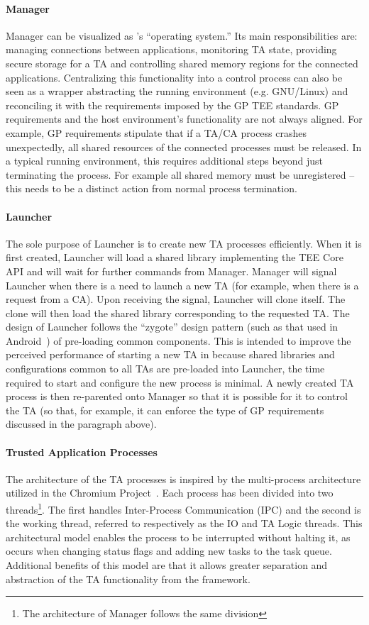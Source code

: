 \documentclass[10pt,conference,letterpaper]{IEEEtran}
\newcommand{\opentee}{\protect{TEE-Vi}\xspace}
\newcommand{\opentee}{\protect{Open-TEE}\xspace}
\begin{document}
\paragraph{Manager}
Manager can be visualized as \opentee's ``operating system.'' Its main responsibilities are: managing connections between applications, monitoring TA state, providing secure storage for a TA and controlling shared memory regions for the connected applications. Centralizing this functionality into a control process can also be seen as a wrapper abstracting the running environment (e.g. GNU/Linux) and reconciling it with the requirements imposed by the GP TEE standards. GP requirements and the host environment's functionality are not always aligned. For example, GP requirements stipulate that if a TA/CA process crashes unexpectedly, all shared resources of the connected processes must be released. In a typical running environment, this requires additional steps beyond just terminating the process. For example all shared memory must be unregistered -- this needs to be a distinct action from normal process termination.

\paragraph{Launcher}
The sole purpose of Launcher is to create new TA processes efficiently. When it is first created, Launcher will load a shared library implementing the TEE Core API and will wait for further commands from Manager. Manager will signal Launcher when there is a need to launch a new TA (for example, when there is a request from a CA). Upon receiving the signal, Launcher will clone itself. The clone will then load the shared library corresponding to the requested TA. The design of Launcher follows the ``zygote'' design pattern (such as that used in Android~\cite{web:zygote}) of pre-loading common components. This is intended to improve the perceived performance of starting a new TA in \opentee because shared libraries and configurations common to all TAs are pre-loaded into Launcher, the time required to start and configure the new process is minimal. A newly created TA process is then re-parented onto Manager so that it is possible for it to control the TA (so that, for example, it can enforce the type of GP requirements discussed in the paragraph above).


\paragraph{Trusted Application Processes}
The architecture of the TA processes is inspired by the multi-process architecture utilized in the Chromium Project~\cite{web:Chromium-multi-arch}. Each process has been divided into two threads\footnote{The architecture of Manager follows the same division}. The first handles Inter-Process Communication (IPC) and the second is the working thread, referred to respectively as the IO and TA Logic threads. This architectural model enables the process to be interrupted without halting it, as occurs when changing status flags and adding new tasks to the task queue. Additional benefits of this model are that it allows greater separation and abstraction of the TA functionality from the \opentee framework.
\end{document}
